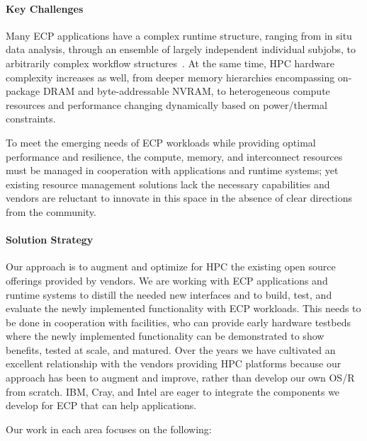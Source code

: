 \paragraph{Key Challenges}

Many ECP applications have a complex runtime structure, ranging from in
situ data analysis, through an ensemble of largely independent individual
subjobs, to arbitrarily complex workflow structures~\cite{dreher2017situ}.  At the same time, HPC
hardware complexity increases as well, from deeper memory hierarchies
encompassing on-package DRAM and byte-addressable NVRAM, to heterogeneous
compute resources and performance changing dynamically based on
power/thermal constraints.

To meet the emerging needs of ECP workloads while providing optimal
performance and resilience, the compute, memory, and interconnect resources
must be managed in cooperation with applications and runtime systems; yet
existing resource management solutions lack the necessary capabilities and
vendors are reluctant to innovate in this space in the absence of clear
directions from the community.


\paragraph{Solution Strategy}

Our approach is to augment and optimize for HPC the existing open source
offerings provided by vendors. We are working with ECP applications and
runtime systems to distill the needed new interfaces and to build, test,
and evaluate the newly implemented functionality with ECP workloads.  This
needs to be done in cooperation with facilities, who can provide early
hardware testbeds where the newly implemented functionality can be
demonstrated to show benefits, tested at scale, and matured.  Over the
years we have cultivated an excellent relationship with the vendors
providing HPC platforms because our approach has been to augment and
improve, rather than develop our own OS/R from scratch.  IBM, Cray, and
Intel are eager to integrate the components we develop for ECP that can
help applications.

Our work in each area focuses on the following:

